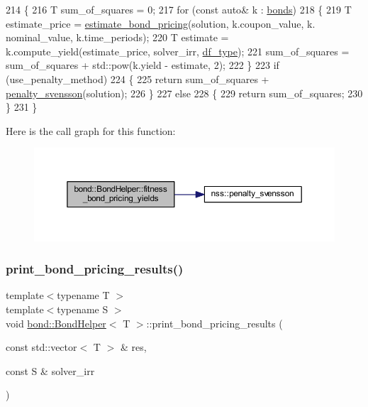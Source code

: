 \begin{DoxyCode}
214     \{
216         T sum\_of\_squares = 0;
217         \textcolor{keywordflow}{for} (\textcolor{keyword}{const} \textcolor{keyword}{auto}& k : \hyperlink{classbond_1_1_bond_helper_a61db751f82d46ce2f7f5032ff2a3b03e}{bonds})
218         \{
219             T estimate\_price = \hyperlink{classbond_1_1_bond_helper_a1288528021e7c60e3a1435d39ad8611d}{estimate\_bond\_pricing}(solution, k.coupon\_value, k.
      nominal\_value, k.time\_periods);
220             T estimate = k.compute\_yield(estimate\_price, solver\_irr, \hyperlink{classbond_1_1_bond_helper_a843e3c12a561aaac047ba70310375a2f}{df\_type});
221             sum\_of\_squares = sum\_of\_squares + std::pow(k.yield - estimate, 2);
222         \}
223         \textcolor{keywordflow}{if} (use\_penalty\_method)
224         \{
225             \textcolor{keywordflow}{return} sum\_of\_squares + \hyperlink{namespacenss_a009a0ebbca20f7969d0c2ed5a241aa82}{penalty\_svensson}(solution);
226         \}
227         \textcolor{keywordflow}{else}
228         \{
229             \textcolor{keywordflow}{return} sum\_of\_squares;
230         \}
231     \}
\end{DoxyCode}
Here is the call graph for this function\+:
\nopagebreak
\begin{figure}[H]
\begin{center}
\leavevmode
\includegraphics[width=350pt]{classbond_1_1_bond_helper_aa1a47c41374aee7914e9c0ac374b39e4_cgraph}
\end{center}
\end{figure}
\mbox{\label{classbond_1_1_bond_helper_a28159ce3ba6b11611d6368fd5a601f45}} 
\subsubsection{\texorpdfstring{print\+\_\+bond\+\_\+pricing\+\_\+results()}{print\_bond\_pricing\_results()}}
{\footnotesize\ttfamily template$<$typename T $>$ \\
template$<$typename S $>$ \\
void \hyperlink{classbond_1_1_bond_helper}{bond\+::\+Bond\+Helper}$<$ T $>$\+::print\+\_\+bond\+\_\+pricing\+\_\+results (\begin{DoxyParamCaption}\item[{const std\+::vector$<$ T $>$ \&}]{res,  }\item[{const S \&}]{solver\+\_\+irr }\end{DoxyParamCaption})}



